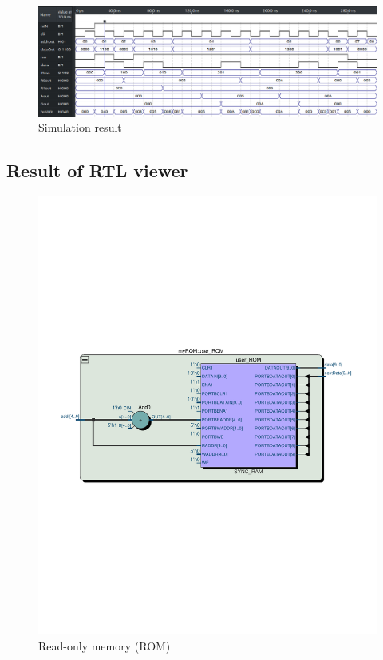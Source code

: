 \documentclass[13pt,a4paper]{report}
\begin{document}
\begin{figure}[H]
\centering
\includegraphics[scale=0.55]{images/Exc2_waveform.png}
\caption*{Simulation result}
\end{figure}

\subsection{Result of RTL viewer}
\begin{figure}[H]
\centering
\includegraphics[scale=0.8, clip, trim={0cm 9.5cm 0cm 10.1cm}]{images/Exc2_myROM_RTL.pdf}
\caption*{Read-only memory (ROM)}
\end{figure}
\end{document}
